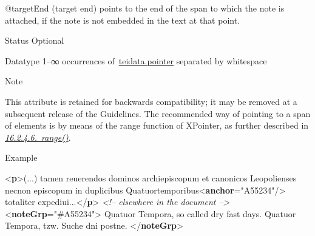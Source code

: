 \begin{reflist}
\begin{sansreflist}
\begin{reflist}
\end{reflist}  
    \item[@targetEnd]
  (target end) points to the end of the span to which the note is attached, if the note is not embedded in the text at that point.
\begin{reflist}
    \item[{Status}]
  Optional
    \item[{Datatype}]
  1–∞ occurrences of \hyperref[TEI.teidata.pointer]{teidata.pointer} separated by whitespace
    \item[{Note}]
  \par
This attribute is retained for backwards compatibility; it may be removed at a subsequent release of the Guidelines. The recommended way of pointing to a span of elements is by means of the \textsf{range} function of XPointer, as further described in \textit{\hyperref[SATSRN]{16.2.4.6.\ range()}}.
\end{reflist}  
\end{sansreflist}  
    \item[{Example}]
  \leavevmode\bgroup{}\exampleFont \begin{shaded}\noindent\mbox{}{<\textbf{p}>}(...) tamen reuerendos dominos archiepiscopum et canonicos Leopolienses\mbox{}\newline 
 necnon episcopum in duplicibus Quatuortemporibus{<\textbf{anchor}\hspace*{1em}{xml:id}="{A55234}"/>} totaliter expediui...{</\textbf{p}>}\mbox{}\newline 
\textit{<!-- elsewhere in the document -->}\mbox{}\newline 
{<\textbf{noteGrp}\hspace*{1em}{targetEnd}="{\#A55234}">}\mbox{}\newline 
{} Quatuor Tempora, so called dry fast days.\mbox{}\newline 
{}\mbox{}\newline 
{} Quatuor Tempora, tzw. Suche dni postne.\mbox{}\newline 
{}\mbox{}\newline 
{</\textbf{noteGrp}>}\end{shaded}\egroup 


\end{reflist}  
